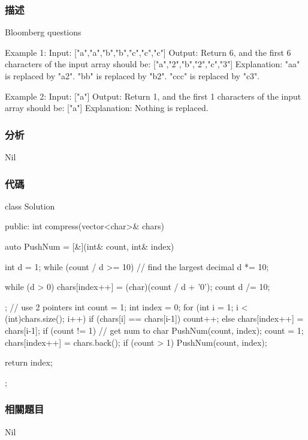 \subsubsection{描述}
Bloomberg questions

\begin{Code}
Example 1:
Input:
    ["a","a","b","b","c","c","c"]
Output:
    Return 6, and the first 6 characters of the
        input array should be: ["a","2","b","2","c","3"]
Explanation:
    "aa" is replaced by "a2". "bb" is replaced by "b2". "ccc" is replaced by "c3".

Example 2:
Input:
    ["a"]
Output:
    Return 1, and the first 1 characters of the input array should be: ["a"]
Explanation:
    Nothing is replaced.
\end{Code}

\subsubsection{分析}
Nil


\subsubsection{代碼}
\begin{Code}
class Solution
{
public:
    int compress(vector<char>& chars) {
        auto PushNum = [&](int& count, int& index)
        {
            int d = 1;
            while (count / d >= 10) // find the largest decimal
                d *= 10;
                    
            while (d > 0)
            {
                chars[index++] = (char)(count / d + '0');
                count %
                d /= 10;
            }
        };
        // use 2 pointers
        int count = 1;
        int index = 0;
        for (int i = 1; i < (int)chars.size(); i++)
        {
            if (chars[i] == chars[i-1])
            {
                count++;
            }
            else
            {
                chars[index++] = chars[i-1];
                if (count != 1)
                {
                    // get num to char
                    PushNum(count, index);
                    count = 1;
                }
            }
        }
        chars[index++] = chars.back();
        if (count > 1)
            PushNum(count, index);
        
        return index;
    }
};
\end{Code}


\subsubsection{相關題目}
Nil

